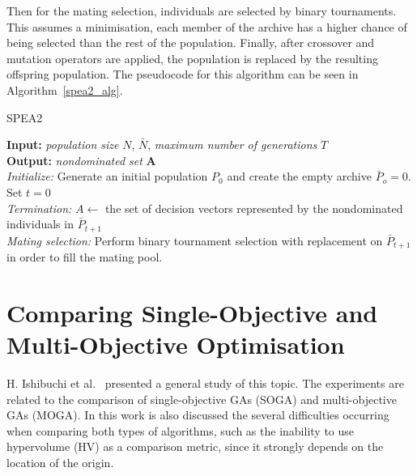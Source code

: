 Then for the mating selection, individuals are selected by binary tournaments. This assumes a minimisation, each member of the archive has a higher chance of being selected than the rest of the population. Finally, after crossover and mutation operators are applied, the population is replaced by the resulting offspring population. The pseudocode for this algorithm can be seen in Algorithm~\ref{spea2_alg}.\\

\begin{algorithm}[H]
\caption{SPEA2}
\label{spea2_alg}
\SetAlgoLined
\textbf{Input:} \textit{population size} $N$,  $\bar N$, \textit{maximum number of generations} $T$\;\\
\textbf{Output:} \textit{nondominated set} \textbf{A}\;\\
\textit{Initialize:} Generate an initial population $P_0$ and create the empty archive $\bar P_o = 0.$ Set $t = 0$\;\\
\textit{Termination:} $A \gets$ the set of decision vectors represented by the nondominated individuals in $\bar P_{t+1}$\;\\
\textit{Mating selection:} Perform binary tournament selection with replacement on $\bar P_{t+1}$ in order to fill the mating pool.
\end{algorithm}

\section{Comparing Single-Objective and Multi-Objective Optimisation}

H. Ishibuchi et al.~\cite{Ishibuchi_single_vs_multiobjective} presented a general study of this topic. The experiments are related to the comparison of single-objective GAs (SOGA) and multi-objective GAs (MOGA). In this work is also discussed the several difficulties occurring when comparing both types of algorithms, such as the inability to use hypervolume (HV) as a comparison metric, since it strongly depends on the location of the origin.\\

